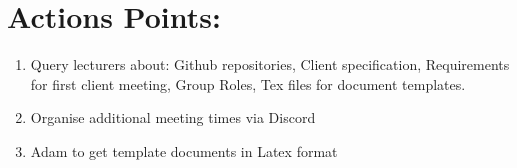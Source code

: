 \documentclass{article}
\begin{document}
\section{Actions Points:}
\begin{enumerate}
\item Query lecturers about: Github repositories, Client specification, Requirements for first client meeting, Group Roles, Tex files for document templates.
\item Organise additional meeting times via Discord
\item Adam to get template documents in Latex format
\end{enumerate}
\end{document}
